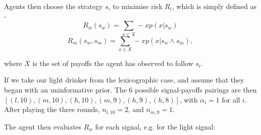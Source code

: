 Agents then choose the strategy $s_{i}$ to minimise risk $R_{i}$, which is simply defined as - 
\begin{equation}
R_{w}(s_{w}) = \sum_{x \in X} -xp(x | s_{w})
\end{equation}
\begin{equation}
R_{m}(s_{w}, s_{m}) = \sum_{x \in X} -xp(x | s_{w}\wedge s_{m}),
\end{equation}

where $X$ is the set of payoffs the agent has observed to follow $s_{i}$.


If we take our light drinker from the lexicographic case, and assume that they began with an uninformative prior. The 6 possible signal-payoffs pairings are then \([(l,10),(m,10),(h,10),(m,9),(h,9),(h,8)]\), with \(\alpha_{i}=1\) for all \(i\). After playing the three rounds, \(n_{l,10}=2\), and \(n_{m,9}=1\).

The agent then evaluates \(R_{w}\) for each signal, e.g. for the light signal:

